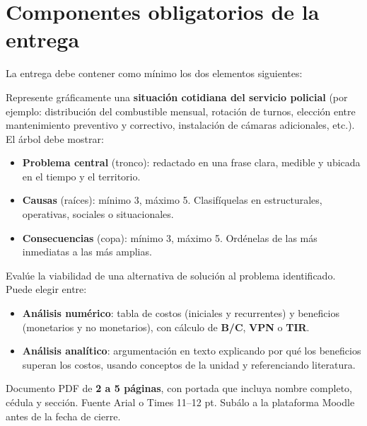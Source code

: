 \documentclass[11pt, a4paper]{article}
\begin{document}
\section{Componentes obligatorios de la entrega}

La entrega debe contener como m\'inimo los dos elementos siguientes:

\begin{cajaPaso}
Represente gr\'aficamente una \textbf{situaci\'on cotidiana del servicio policial} (por ejemplo: distribuci\'on del combustible mensual, rotaci\'on de turnos, elecci\'on entre mantenimiento preventivo y correctivo, instalaci\'on de c\'amaras adicionales, etc.). El \'arbol debe mostrar:
\begin{itemize}[leftmargin=1.5em]
\item \textbf{Problema central} (tronco): redactado en una frase clara, medible y ubicada en el tiempo y el territorio.
\item \textbf{Causas} (ra\'ices): m\'inimo 3, m\'aximo 5. Clasif\'iquelas en estructurales, operativas, sociales o situacionales.
\item \textbf{Consecuencias} (copa): m\'inimo 3, m\'aximo 5. Ord\'enelas de las m\'as inmediatas a las m\'as amplias.
\end{itemize}
\end{cajaPaso}

\begin{cajaPaso}
Eval\'ue la viabilidad de una alternativa de soluci\'on al problema identificado. Puede elegir entre:
\begin{itemize}[leftmargin=1.5em]
\item \textbf{An\'alisis num\'erico}: tabla de costos (iniciales y recurrentes) y beneficios (monetarios y no monetarios), con c\'alculo de \textbf{B/C}, \textbf{VPN} o \textbf{TIR}.
\item \textbf{An\'alisis anal\'itico}: argumentaci\'on en texto explicando por qu\'e los beneficios superan los costos, usando conceptos de la unidad y referenciando literatura.
\end{itemize}
\end{cajaPaso}

\begin{cajaInfo}
Documento PDF de \textbf{2 a 5 p\'aginas}, con portada que incluya nombre completo, c\'edula y secci\'on. Fuente Arial o Times 11--12 pt. Sub\'alo a la plataforma Moodle antes de la fecha de cierre.
\end{cajaInfo}
\end{document}
